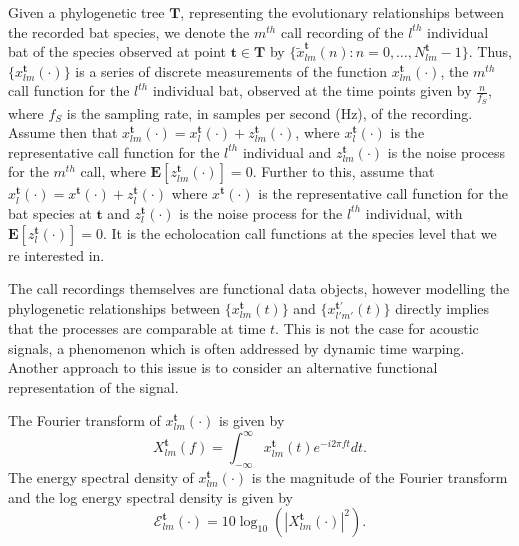 \documentclass[wsdraft]{ws-rv9x6} %
\begin{document}
Given a phylogenetic tree \(\mathbf{T}\), representing the evolutionary relationships between the recorded bat species, we denote the \(m^{th}\) call recording of the \(l^{th}\) individual bat of the species observed at point \(\mathbf{t} \in \mathbf{T}\) by \(\{\tilde{x}_{lm}^{\mathbf{t}}(n) : n = 0, \dots, N_{lm}^{\mathbf{t}} - 1\}\). 
Thus, \(\{x_{lm}^{\mathbf{t}}(\cdot)\}\) is a series of discrete measurements of the function \(x_{lm}^{\mathbf{t}}(\cdot)\), the \(m^{th}\) call function for the \(l^{th}\) individual bat, observed at the time points given by \(\frac{n}{f_S}\), where \(f_S\) is the sampling rate, in samples per second (Hz), of the recording. Assume then that \(x_{lm}^{\mathbf{t}}(\cdot) = x_{l}^{\mathbf{t}}(\cdot) + z_{lm}^{\mathbf{t}}(\cdot)\), where \(x_{l}^{\mathbf{t}}(\cdot)\) is the representative call function for the \(l^{th}\) individual and \(z_{lm}^{\mathbf{t}}(\cdot)\) is the noise process for the \(m^{th}\) call, where \(\mathbf{E}[z_{lm}^{\mathbf{t}}(\cdot)] = 0\). Further to this, assume that \(x_{l}^{\mathbf{t}}(\cdot) = x^{\mathbf{t}}(\cdot) + z_{l}^{\mathbf{t}}(\cdot)\) where \(x^{\mathbf{t}}(\cdot)\) is the representative call function for the bat species at \({\mathbf{t}}\) and \(z_{l}^{\mathbf{t}}(\cdot)\) is the noise process for the \(l^{th}\) individual, with \(\mathbf{E}[z_{l}^{\mathbf{t}}(\cdot)] = 0\). It is the echolocation call functions at the species level that we re interested in.

The call recordings themselves are functional data objects, however modelling the phylogenetic relationships between \(\{x_{lm}^{\mathbf{t}}(t)\}\) and \(\{x_{l'm'}^{{\mathbf{t}}'}(t)\}\) directly implies that the processes are comparable at time \(t\). 
This is not the case for acoustic signals, a phenomenon which is often addressed by dynamic time warping.\cite{berndt1994using} Another approach to this issue is to consider an alternative functional representation of the signal. 

The Fourier transform of \(x_{lm}^{\mathbf{t}}(\cdot)\) is given by
\[
X_{lm}^{\mathbf{t}}(f) = \int_{-\infty}^{\infty} x_{lm}^{\mathbf{t}}(t) e^{-i 2\pi f t} dt.
\label{eqn:dft}
\]
The energy spectral density of \(x_{lm}^{\mathbf{t}}(\cdot)\) is the magnitude of the Fourier transform and the log energy spectral density is given by
\begin{equation}
\mathcal{E}_{lm}^{\mathbf{t}}(\cdot) = 10 \log_{10} \left( |X_{lm}^{\mathbf{t}}(\cdot)|^2 \right).
\label{eqn:esd}
\end{equation}
\end{document}
